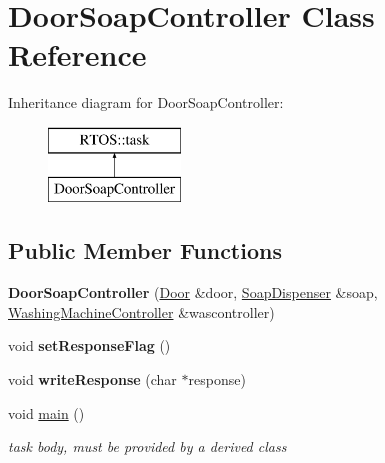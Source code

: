 \hypertarget{class_door_soap_controller}{}\section{Door\+Soap\+Controller Class Reference}
\label{class_door_soap_controller}
Inheritance diagram for Door\+Soap\+Controller\+:\begin{figure}[H]
\begin{center}
\leavevmode
\includegraphics[height=2.000000cm]{class_door_soap_controller}
\end{center}
\end{figure}
\subsection*{Public Member Functions}
\begin{DoxyCompactItemize}
\item 
{\bfseries Door\+Soap\+Controller} (\hyperlink{class_door}{Door} \&door, \hyperlink{class_soap_dispenser}{Soap\+Dispenser} \&soap, \hyperlink{class_washing_machine_controller}{Washing\+Machine\+Controller} \&wascontroller)\hypertarget{class_door_soap_controller_a7b2ed68a2bbd7d25c84b9f17ba89eda0}{}\label{class_door_soap_controller_a7b2ed68a2bbd7d25c84b9f17ba89eda0}

\item 
void {\bfseries set\+Response\+Flag} ()\hypertarget{class_door_soap_controller_a129c7e3fb6940ea5aedb174494191875}{}\label{class_door_soap_controller_a129c7e3fb6940ea5aedb174494191875}

\item 
void {\bfseries write\+Response} (char $\ast$response)\hypertarget{class_door_soap_controller_a718f7792ba9a2706e7e1949e8281114f}{}\label{class_door_soap_controller_a718f7792ba9a2706e7e1949e8281114f}

\item 
void \hyperlink{class_door_soap_controller_ac8ad8ea136b4ff66805419f394c5acc0}{main} ()
\begin{DoxyCompactList}\small\item\em task body, must be provided by a derived class \end{DoxyCompactList}\end{DoxyCompactItemize}
